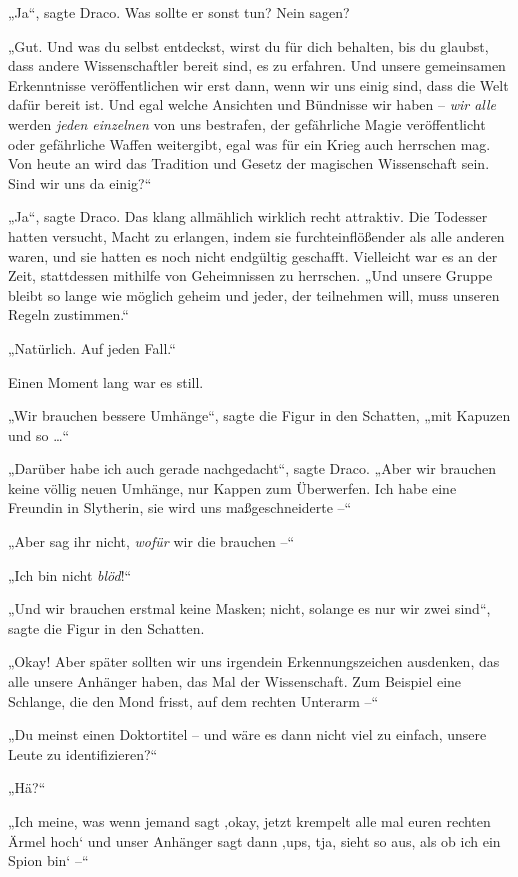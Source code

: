{„Ja“, sagte Draco. Was sollte er sonst tun? Nein sagen?

„Gut. Und was du selbst entdeckst, wirst du für dich behalten, bis du glaubst, dass andere Wissenschaftler bereit sind, es zu erfahren. Und unsere gemeinsamen Erkenntnisse veröffentlichen wir erst dann, wenn wir uns einig sind, dass die Welt dafür bereit ist. Und egal welche Ansichten und Bündnisse wir haben -- \emph{wir alle} werden \emph{jeden einzelnen} von uns bestrafen, der gefährliche Magie veröffentlicht oder gefährliche Waffen weitergibt, egal was für ein Krieg auch herrschen mag. Von heute an wird das Tradition und Gesetz der magischen Wissenschaft sein. Sind wir uns da einig?“

„Ja“, sagte Draco. Das klang allmählich wirklich recht attraktiv. Die Todesser hatten versucht, Macht zu erlangen, indem sie furchteinflößender als alle anderen waren, und sie hatten es noch nicht endgültig geschafft. Vielleicht war es an der Zeit, stattdessen mithilfe von Geheimnissen zu herrschen. „Und unsere Gruppe bleibt so lange wie möglich geheim und jeder, der teilnehmen will, muss unseren Regeln zustimmen.“

„Natürlich. Auf jeden Fall.“

Einen Moment lang war es still.

„Wir brauchen bessere Umhänge“, sagte die Figur in den Schatten, „mit Kapuzen und so …“

„Darüber habe ich auch gerade nachgedacht“, sagte Draco. „Aber wir brauchen keine völlig neuen Umhänge, nur Kappen zum Überwerfen. Ich habe eine Freundin in Slytherin, sie wird uns maßgeschneiderte --“

„Aber sag ihr nicht, \emph{wofür} wir die brauchen --“

„Ich bin nicht \emph{blöd}!“

„Und wir brauchen erstmal keine Masken; nicht, solange es nur wir zwei sind“, sagte die Figur in den Schatten.

„Okay! Aber später sollten wir uns irgendein Erkennungszeichen ausdenken, das alle unsere Anhänger haben, das Mal der Wissenschaft. Zum Beispiel eine Schlange, die den Mond frisst, auf dem rechten Unterarm --“

„Du meinst einen Doktortitel -- und wäre es dann nicht viel zu einfach, unsere Leute zu identifizieren?“

„Hä?“

„Ich meine, was wenn jemand sagt ‚okay, jetzt krempelt alle mal euren rechten Ärmel hoch` und unser Anhänger sagt dann ‚ups, tja, sieht so aus, als ob ich ein Spion bin` --“

}
